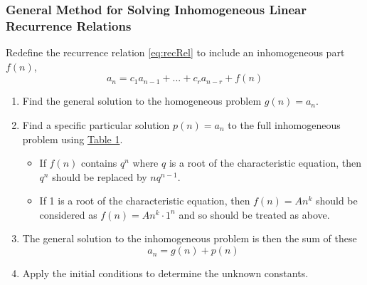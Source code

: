 
\newpage\subsubsection{General Method for Solving Inhomogeneous Linear Recurrence Relations}

Redefine the recurrence relation \eqref{eq:recRel} to include an inhomogeneous part \(f(n)\),
\begin{equation}
    a_n = c_1a_{n-1} + ... + c_ra_{n-r} + f(n)
\end{equation} 

\begin{enumerate}
    \item Find the general solution to the homogeneous problem \(g(n) = a_n\).
    \item Find a specific particular solution \(p(n) = a_n\) to the full inhomogeneous problem using \hyperref[tab:Forms of the Particular Solution]{Table 1}.
    \begin{itemize}
        \item If \(f(n)\) contains \(q^n\) where \(q\) is a root of the characteristic equation, then \(q^n\) should be replaced by \(nq^{n-1}\).
        \item If 1 is a root of the characteristic equation, then \(f(n) = An^k\) should be considered as \(f(n) = An^k \cdot 1^n\) and so should be treated as above.
    \end{itemize}
    \item The general solution to the inhomogeneous problem is then the sum of these
    \begin{equation}
        a_n = g(n) + p(n)
    \end{equation}
    \item Apply the initial conditions to determine the unknown constants.
\end{enumerate}

